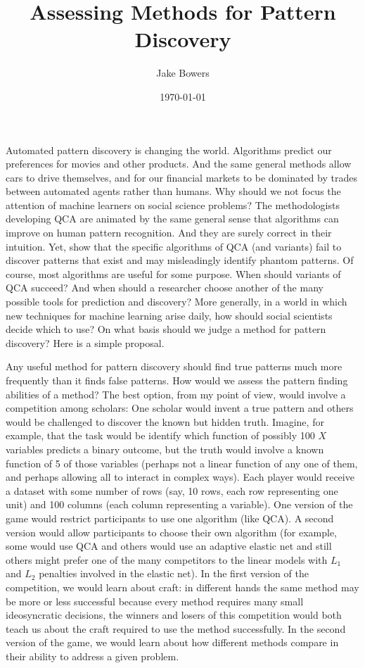 \documentclass[12pt]{article}
\title{Assessing Methods for Pattern Discovery}
\author{Jake Bowers}
\date{\today}
\begin{document}
\maketitle

Automated pattern discovery is changing the world. Algorithms predict our
preferences for movies and other products. And the same general methods allow
cars to drive themselves, and for our financial markets to be dominated by
trades between automated agents rather than humans. Why should we not focus
the attention of machine learners on social science problems? The
methodologists developing QCA are animated by the same general sense that
algorithms can improve on human pattern recognition. And they are surely
correct in their intuition. Yet, \citet{lucasfk2013} show that the specific
algorithms of QCA (and variants) fail to discover patterns that exist and may
misleadingly identify phantom patterns. Of course, most algorithms are useful
for some purpose. When should variants of QCA succeed? And when should a
researcher choose another of the many possible tools for prediction and
discovery? More generally, in a world in which new techniques for machine
learning arise daily, how should social scientists decide which to use? On
what basis should we judge a method for pattern discovery? Here is a simple
proposal.

Any useful method for pattern discovery should find true patterns much more
frequently than it finds false patterns. How would we assess the pattern
finding abilities of a method? The best option, from my point of view, would
involve a competition among scholars: One scholar would invent a true pattern
and others would be challenged to discover the known but hidden truth.
Imagine, for example, that the task would be identify which function of
possibly 100 $X$ variables predicts a binary outcome, but the truth would
involve a known function of 5 of those variables (perhaps not a linear
function of any one of them, and perhaps allowing all to interact in complex
ways). Each player would receive a dataset with some number of rows (say, 10
rows, each row representing one unit) and 100 columns (each column
representing a variable). One version of the game would restrict participants
to use one algorithm (like QCA). A second version would allow participants to
choose their own algorithm (for example, some would use QCA and others would
use an adaptive elastic net \citet{zou2009adaptive,zou2006adaptive} and still
others might prefer one of the many competitors to the linear models with
$L_1$ and $L_2$ penalties involved in the elastic net). In the first version
of the competition, we would learn about craft: in different hands the same
method may be more or less successful because every method requires many small
ideosyncratic decisions, the winners and losers of this competition would both
teach us about the craft required to use the method successfully.  In the
second version of the game, we would learn about how different methods compare
in their ability to address a given problem.
\end{document}
